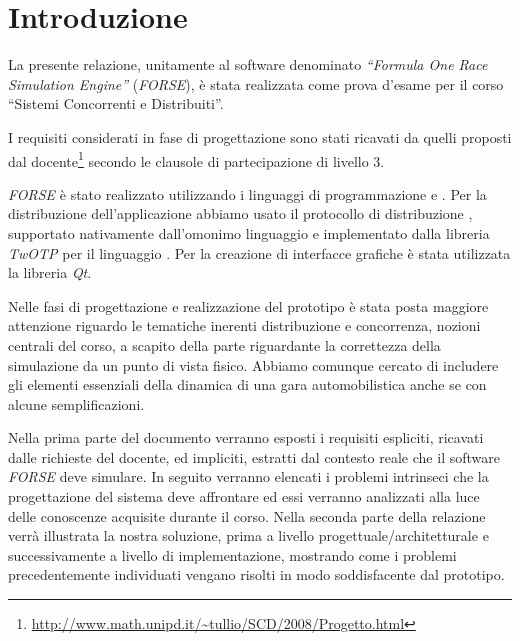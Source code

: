 \chapter{Introduzione}

La presente relazione, unitamente al software denominato \textsl{``Formula One Race Simulation Engine''} (\textsl{FORSE}), è stata realizzata come prova d'esame per il corso ``Sistemi Concorrenti e Distribuiti''.

I requisiti considerati in fase di progettazione sono stati ricavati da quelli proposti dal docente\footnote{\url{http://www.math.unipd.it/~tullio/SCD/2008/Progetto.html}} secondo le clausole di partecipazione di livello 3.

\textsl{FORSE} è stato realizzato utilizzando i linguaggi di programmazione \Erlang{} e \Python{}. Per la distribuzione dell'applicazione abbiamo
usato il protocollo di distribuzione \Erlang{}, supportato nativamente dall'omonimo linguaggio e implementato dalla libreria \textsl{TwOTP} per il linguaggio
\Python{}.
Per la creazione di interfacce grafiche è stata utilizzata la libreria \textsl{Qt}.

Nelle fasi di progettazione e realizzazione del prototipo è stata posta maggiore attenzione riguardo le tematiche inerenti distribuzione e concorrenza, nozioni
centrali del corso, a scapito della parte riguardante la correttezza della simulazione da un punto di vista fisico. Abbiamo comunque cercato di includere
gli elementi essenziali della dinamica di una gara automobilistica anche se con alcune semplificazioni.

Nella prima parte del documento verranno esposti i requisiti espliciti, ricavati dalle richieste del docente, ed impliciti, estratti dal contesto reale che il software \textsl{FORSE} deve simulare.
In seguito verranno elencati i problemi intrinseci che la progettazione del sistema deve affrontare ed essi verranno analizzati alla luce delle conoscenze acquisite durante il corso.
Nella seconda parte della relazione verrà illustrata la nostra soluzione, prima a livello progettuale/architetturale e successivamente a livello di implementazione, mostrando come i problemi precedentemente individuati vengano risolti in modo soddisfacente dal prototipo.
